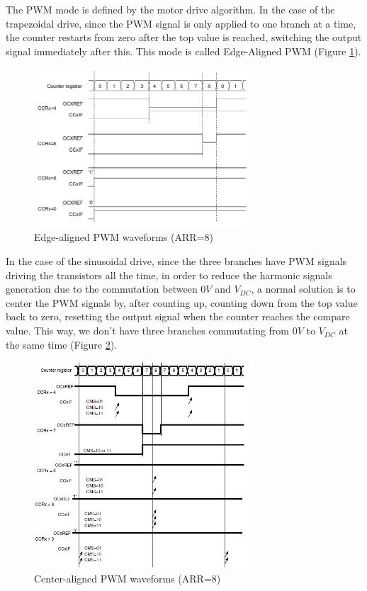 The \ac{PWM} mode is defined by the motor drive algorithm. In the case of the trapezoidal drive, since the \ac{PWM} signal is only applied to one branch at a time, the counter restarts from zero after the top value is reached, switching the output signal immediately after this. This mode is called Edge-Aligned \ac{PWM} (Figure \ref{fig:edge_pwm}).

\begin{figure}[htbp]
\centering
\includegraphics[width=8cm]{Images/edge_pwm.png} 
\caption[Edge-aligned PWM waveforms]{Edge-aligned PWM waveforms (ARR=8)}
\label{fig:edge_pwm}
\end{figure}

In the case of the sinusoidal drive, since the three branches have \ac{PWM} signals driving the transistors all the time, in order to reduce the harmonic signals generation due to the commutation between $0V$ and $V_{DC}$, a normal solution is to center the \ac{PWM} signals by, after counting up, counting down from the top value back to zero, resetting the output signal when the counter reaches the compare value. This way, we don't have three branches commutating from $0V$ to $V_{DC}$ at the same time (Figure \ref{fig:center_pwm}).

\begin{figure}[htbp]
\centering
\includegraphics[width=8cm]{Images/center_pwm.png} 
\caption[Center-aligned PWM waveforms]{Center-aligned PWM waveforms (ARR=8)}
\label{fig:center_pwm}
\end{figure}


